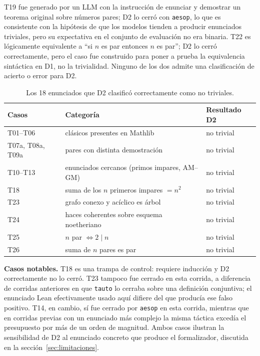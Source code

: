 \documentclass[12pt,a4paper]{article}
\theoremstyle{remark}
\begin{document}
T19 fue generado por un LLM con la instrucción de enunciar y demostrar un teorema original sobre números pares; D2 lo cerró con \texttt{aesop}, lo que es consistente con la hipótesis de que los modelos tienden a producir enunciados triviales, pero su expectativa en el conjunto de evaluación no era binaria. T22 es lógicamente equivalente a ``si $n$ es par entonces $n$ es par''; D2 lo cerró correctamente, pero el caso fue construido para poner a prueba la equivalencia sintáctica en D1, no la trivialidad. Ninguno de los dos admite una clasificación de acierto o error para D2.

\begin{table}[htbp]
\centering
\small
\setlength{\tabcolsep}{5pt}
\begin{tabular}{p{4.6cm}p{6.4cm}l}
\toprule
Casos & Categoría & Resultado D2 \\
\midrule
T01--T06                & clásicos presentes en Mathlib            & no trivial \\
T07a, T08a, T09a        & pares con distinta demostración          & no trivial \\
T10--T13                & enunciados cercanos (primos impares, AM--GM) & no trivial \\
T18                     & suma de los $n$ primeros impares $= n^2$ & no trivial \\
T23                     & grafo conexo y acíclico es árbol         & no trivial \\
T24                     & haces coherentes sobre esquema noetheriano & no trivial \\
T25                     & $n$ par $\iff 2 \mid n$                  & no trivial \\
T26                     & suma de $n$ pares es par                 & no trivial \\
\bottomrule
\end{tabular}
\caption{Los 18 enunciados que D2 clasificó correctamente como no triviales.}
\label{tab:d2notrivial}
\end{table}

\textbf{Casos notables.} T18 es una trampa de control: requiere inducción y D2 correctamente no lo cerró. T23 tampoco fue cerrado en esta corrida, a diferencia de corridas anteriores en que \texttt{tauto} lo cerraba sobre una definición conjuntiva; el enunciado Lean efectivamente usado aquí difiere del que producía ese falso positivo. T14, en cambio, sí fue cerrado por \texttt{aesop} en esta corrida, mientras que en corridas previas con un enunciado más complejo la misma táctica excedía el presupuesto por más de un orden de magnitud. Ambos casos ilustran la sensibilidad de D2 al enunciado concreto que produce el formalizador, discutida en la sección~\ref{sec:limitaciones}.
\end{document}
